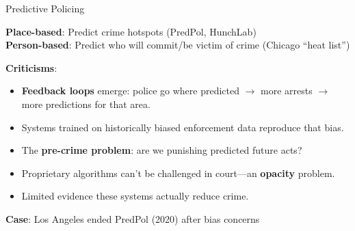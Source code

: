 ﻿\documentclass[aspectratio=169,11pt]{beamer}
\begin{document}
\begin{frame}{Predictive Policing}
\begin{conceptbox}
\small
\textbf{Place-based}: Predict crime hotspots (PredPol, HunchLab)\\
\textbf{Person-based}: Predict who will commit/be victim of crime (Chicago ``heat list'')
\end{conceptbox}

\vspace{0.3em}
\textbf{Criticisms}:
\begin{itemize}
    \item \textbf{Feedback loops} emerge: police go where predicted $\rightarrow$ more arrests $\rightarrow$ more predictions for that area.
    \item Systems trained on historically biased enforcement data reproduce that bias.
    \item The \textbf{pre-crime problem}: are we punishing predicted future acts?
    \item Proprietary algorithms can't be challenged in court---an \textbf{opacity} problem.
    \item Limited evidence these systems actually reduce crime.
\end{itemize}

\textbf{Case}: Los Angeles ended PredPol (2020) after bias concerns
\end{frame}
\end{document}
